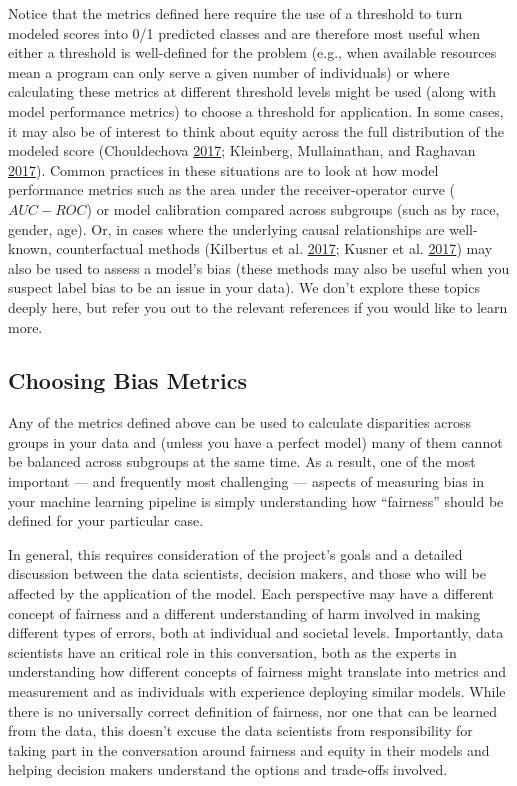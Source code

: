 \documentclass[]{krantz}
\begin{document}
Notice that the metrics defined here require the use of a threshold to
turn modeled scores into 0/1 predicted classes and are therefore most
useful when either a threshold is well-defined for the problem (e.g.,
when available resources mean a program can only serve a given number of
individuals) or where calculating these metrics at different threshold
levels might be used (along with model performance metrics) to choose a
threshold for application. In some cases, it may also be of interest to
think about equity across the full distribution of the modeled score
(Chouldechova \protect\hyperlink{ref-chouldechova2017}{2017}; Kleinberg,
Mullainathan, and Raghavan \protect\hyperlink{ref-kleinberg2017}{2017}).
Common practices in these situations are to look at how model
performance metrics such as the area under the receiver-operator curve
(\(AUC-ROC\)) or model calibration compared across subgroups (such as by
race, gender, age). Or, in cases where the underlying causal
relationships are well-known, counterfactual methods (Kilbertus et al.
\protect\hyperlink{ref-kilbertus2017}{2017}; Kusner et al.
\protect\hyperlink{ref-kusner2017}{2017}) may also be used to assess a
model's bias (these methods may also be useful when you suspect label
bias to be an issue in your data). We don't explore these topics deeply
here, but refer you out to the relevant references if you would like to
learn more.

\subsection{Choosing Bias Metrics}\label{choosing-bias-metrics}

Any of the metrics defined above can be used to calculate disparities
across groups in your data and (unless you have a perfect model) many of
them cannot be balanced across subgroups at the same time. As a result,
one of the most important --- and frequently most challenging ---
aspects of measuring bias in your machine learning pipeline is simply
understanding how ``fairness'' should be defined for your particular
case.

In general, this requires consideration of the project's goals and a
detailed discussion between the data scientists, decision makers, and
those who will be affected by the application of the model. Each
perspective may have a different concept of fairness and a different
understanding of harm involved in making different types of errors, both
at individual and societal levels. Importantly, data scientists have an
critical role in this conversation, both as the experts in understanding
how different concepts of fairness might translate into metrics and
measurement and as individuals with experience deploying similar models.
While there is no universally correct definition of fairness, nor one
that can be learned from the data, this doesn't excuse the data
scientists from responsibility for taking part in the conversation
around fairness and equity in their models and helping decision makers
understand the options and trade-offs involved.
\end{document}
